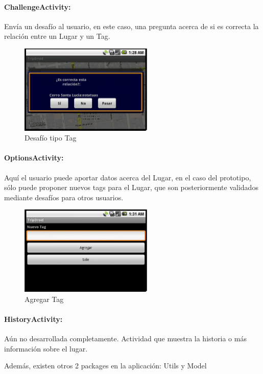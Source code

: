 \documentclass[10pt,letterpaper]{article}
\begin{document}
\newpage
\paragraph{ChallengeActivity:} Envía un desafío al usuario, en este caso, una pregunta acerca de si es correcta la relación entre un Lugar y un Tag.

\begin{figure}[h]
\hspace{3cm}
\includegraphics[width=180pt]{./imgs/TripdroidDesafio.png}
\caption{Desafío tipo Tag}
\end{figure}

\paragraph{OptionsActivity:} Aquí el usuario puede aportar datos acerca del Lugar, en el caso del prototipo, sólo puede proponer nuevos tags para el Lugar, que son posteriormente validados mediante desafíos para otros usuarios.

\begin{figure}[h]
\hspace{3cm}
\includegraphics[width=180pt]{./imgs/TripdroidOpciones.png}
\caption{Agregar Tag}
\end{figure}

\paragraph{HistoryActivity:} Aún no desarrollada completamente. Actividad que muestra la historia o más información sobre el lugar.

\newpage
Además, existen otros 2 packages en la aplicación: Utils y Model\\
\end{document}
